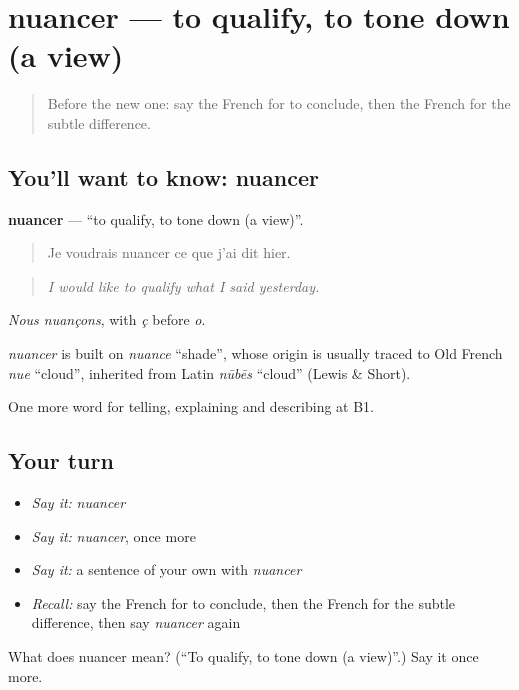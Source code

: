 \section[nuancer]{nuancer — to qualify, to tone down (a view)}

\label{lesson:FR-C344-nuancer}



\begin{quote}
Before the new one: say the French for to conclude, then the French for the subtle difference.
\end{quote}

\subsection*{You'll want to know: nuancer}
\textbf{nuancer} — \textquotedblleft{}to qualify, to tone down (a view)\textquotedblright{}.

\begin{quote}
Je voudrais nuancer ce que j'ai dit hier.
\end{quote}

\begin{quote}
\emph{I would like to qualify what I said yesterday.}
\end{quote}

\emph{Nous nuançons}, with \emph{ç} before \emph{o}.

\begin{cousinweb}
\emph{nuancer} is built on \emph{nuance} \textquotedblleft{}shade\textquotedblright{}, whose origin is usually traced to Old French \emph{nue} \textquotedblleft{}cloud\textquotedblright{}, inherited from Latin \emph{nūbēs} \textquotedblleft{}cloud\textquotedblright{} (Lewis \& Short).
\end{cousinweb}

\begin{grammarlens}[title={What you've built}]
One more word for telling, explaining and describing at B1.
\end{grammarlens}

\subsection*{Your turn}
\begin{itemize}
\raggedright
  \item \emph{Say it:} \emph{nuancer}
  \item \emph{Say it:} \emph{nuancer}, once more
  \item \emph{Say it:} a sentence of your own with \emph{nuancer}
  \item \emph{Recall:} say the French for to conclude, then the French for the subtle difference, then say \emph{nuancer} again
\end{itemize}

\begin{tcolorbox}[breakable,colback=teal!4,colframe=teal!35!black,title={Before you move on}]
What does nuancer mean? (\textquotedblleft{}To qualify, to tone down (a view)\textquotedblright{}.) Say it once more.
\end{tcolorbox}
